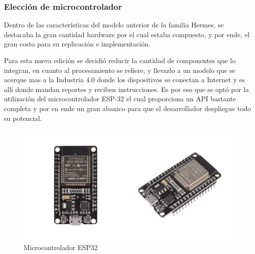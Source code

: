 \subsubsection{Elección de microcontrolador}

Dentro de las características del modelo anterior de la familia Hermes, se destacaba la gran cantidad hardware por el cual estaba compuesto, y por ende, el gran costo para su replicación e implementación.

Para esta nueva edición se decidió reducir la cantidad de componentes que lo integran, en cuanto al procesamiento se refiere, y llevarlo a un modelo que se acerque mas a la Industria 4.0 donde los dispositivos se conectan a Internet y es allí donde mandan reportes y reciben instrucciones. Es por eso que se optó por la utilización del microcontrolador ESP-32 el cual proporciona un API bastante completa y por en ende un gran abanico para que el desarrollador despliegue todo su potencial. \cite{kolban2017kolban}

\begin{figure}[H]
   \centering
   \includegraphics[width=0.7\linewidth]{images/esp32-micro.jpg}
   \caption{Microcontrolador ESP32}
   \label{fig:microcontrolador}
\end{figure}